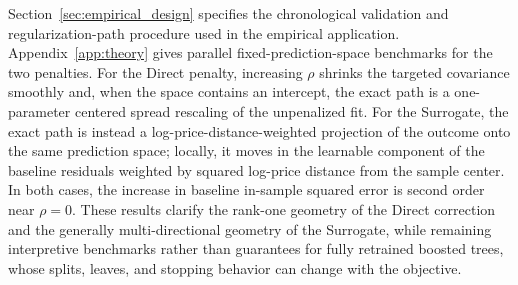 \documentclass[10pt]{article}
\theoremstyle{definition}
\newcommand{\1}{\mathbf{1}}
\newcommand{\oldtext}[1]{\textcolor{blue}{\sout{#1}}}
\newcommand{\newtext}[1]{\textcolor{impGreen}{#1}}
\begin{document}
\newtext{Section~\ref{sec:empirical_design} specifies the chronological validation and regularization-path procedure used in the empirical application. Appendix~\ref{app:theory} gives parallel fixed-prediction-space benchmarks for the two penalties. For the Direct penalty, increasing $\rho$ shrinks the targeted covariance smoothly and, when the space contains an intercept, the exact path is a one-parameter centered spread rescaling of the unpenalized fit. For the Surrogate, the exact path is instead a log-price-distance-weighted projection of the outcome onto the same prediction space; locally, it moves in the learnable component of the baseline residuals weighted by squared log-price distance from the sample center. In both cases, the increase in baseline in-sample squared error is second order near $\rho=0$. These results clarify the rank-one geometry of the Direct correction and the generally multi-directional geometry of the Surrogate, while remaining interpretive benchmarks rather than guarantees for fully retrained boosted trees, whose splits, leaves, and stopping behavior can change with the objective.}




\end{document}
